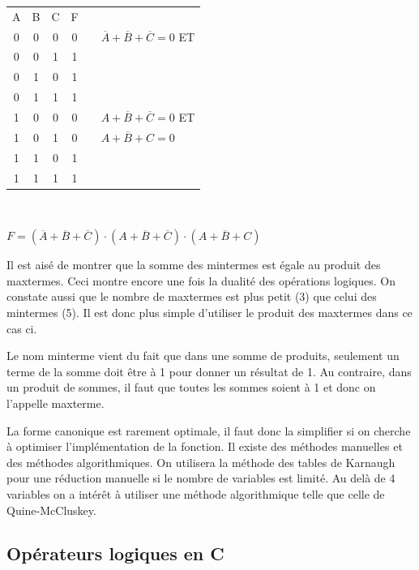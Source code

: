 \begin{center}
\begin{tabular}{*{3}{|c} ||c| p{1cm} p{5cm}}
A & B & C & F\\
0 & 0 & 0 & 0 & & $\overline{A} + \overline{B} + \overline{C} = 0$ ET\\
0 & 0 & 1 & 1\\
0 & 1 & 0 & 1\\
0 & 1 & 1 & 1\\
1 & 0 & 0 & 0 & & $A + \overline{B} + \overline{C} = 0$ ET\\
1 & 0 & 1 & 0 & & $A + \overline{B} + C = 0$\\
1 & 1 & 0 & 1\\
1 & 1 & 1 & 1\\
\end{tabular}\\
\end{center}

\begin{center}
$F = (\overline{A} + \overline{B} + \overline{C}) \cdot (A + \overline{B} + \overline{C}) \cdot (A + \overline{B} + C)$
\end{center}

Il est aisé de montrer que la somme des mintermes est égale au produit des maxtermes. Ceci montre encore une fois la dualité des opérations logiques. On constate aussi que le nombre de maxtermes est plus petit (3) que celui des mintermes (5). Il est donc plus simple d'utiliser le produit des maxtermes dans ce cas ci.

Le nom minterme vient du fait que dans une somme de produits, seulement un terme de la somme doit être à 1 pour donner un résultat de 1. Au contraire, dans un produit de sommes, il faut que toutes les sommes soient à 1 et donc on l'appelle maxterme.

La forme canonique est rarement optimale, il faut donc la simplifier si on cherche à optimiser l'implémentation de la fonction. Il existe des méthodes manuelles et des méthodes algorithmiques. On utilisera la méthode des tables de Karnaugh pour une réduction manuelle si le nombre de variables est limité. Au delà de 4 variables on a intérêt à utiliser une méthode algorithmique telle que celle de Quine-McCluskey.

\subsection{Opérateurs logiques en C}

